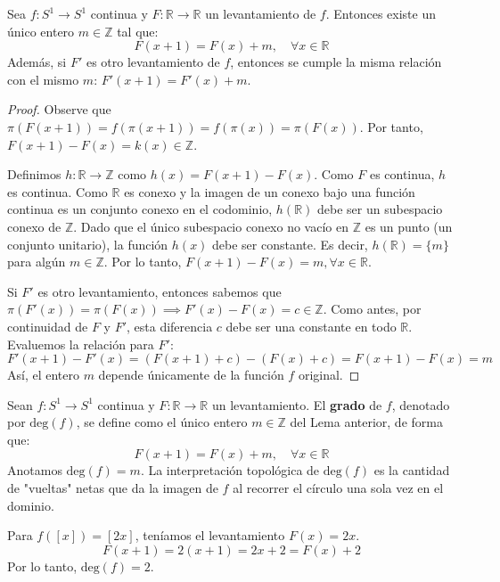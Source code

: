 \begin{lema}
	Sea $f: S^1 \to S^1$ continua y $F: \mathbb{R} \to \mathbb{R}$ un levantamiento de $f$. Entonces existe un único entero $m \in \mathbb{Z}$ tal que:
	$$ F(x+1) = F(x) + m, \quad \forall x \in \mathbb{R} $$
	Además, si $F'$ es otro levantamiento de $f$, entonces se cumple la misma relación con el mismo $m$: $F'(x+1) = F'(x) + m$.
\end{lema}
\begin{proof}
	Observe que $\pi(F(x+1)) = f(\pi(x+1)) = f(\pi(x)) = \pi(F(x))$. 
	Por tanto, $F(x+1) - F(x) = k(x) \in \mathbb{Z}$.
	
	Definimos $h: \mathbb{R} \to \mathbb{Z}$ como $h(x) = F(x+1) - F(x)$. 
	Como $F$ es continua, $h$ es continua. Como $\mathbb{R}$ es conexo y la imagen de un conexo bajo una función continua es un conjunto conexo en el codominio, $h(\mathbb{R})$ debe ser un subespacio conexo de $\mathbb{Z}$. 
	Dado que el único subespacio conexo no vacío en $\mathbb{Z}$ es un punto (un conjunto unitario), la función $h(x)$ debe ser constante. Es decir, $h(\mathbb{R}) = \{m\}$ para algún $m \in \mathbb{Z}$.
	Por lo tanto, $F(x+1) - F(x) = m, \forall x \in \mathbb{R}$.
	
	Si $F'$ es otro levantamiento, entonces sabemos que $\pi(F'(x)) = \pi(F(x)) \implies F'(x) - F(x) = c \in \mathbb{Z}$. Como antes, por continuidad de $F$ y $F'$, esta diferencia $c$ debe ser una constante en todo $\mathbb{R}$.
	Evaluemos la relación para $F'$:
	$$ F'(x+1) - F'(x) = (F(x+1) + c) - (F(x) + c) = F(x+1) - F(x) = m $$
	Así, el entero $m$ depende únicamente de la función $f$ original.
\end{proof}

\begin{definicion}
	Sean $f: S^1 \to S^1$ continua y $F: \mathbb{R} \to \mathbb{R}$ un levantamiento. El \textbf{grado} de $f$, denotado por $\text{deg}(f)$, se define como el único entero $m \in \mathbb{Z}$ del Lema anterior, de forma que:
	$$ F(x+1) = F(x) + m, \quad \forall x \in \mathbb{R} $$
	Anotamos $\text{deg}(f) = m$. La interpretación topológica de $\text{deg}(f)$ es la cantidad de "vueltas" netas que da la imagen de $f$ al recorrer el círculo una sola vez en el dominio.
\end{definicion}

\begin{ejemplo}
	Para $f([x]) = [2x]$, teníamos el levantamiento $F(x) = 2x$.
	$$ F(x+1) = 2(x+1) = 2x + 2 = F(x) + 2 $$
	Por lo tanto, $\text{deg}(f) = 2$.
\end{ejemplo}

